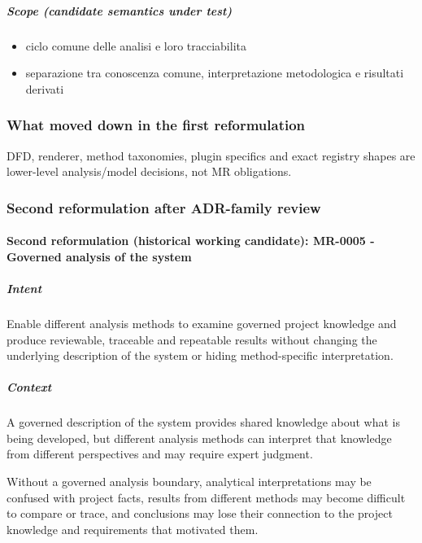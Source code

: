 \documentclass[
  10pt,
]{article}
\providecommand{\tightlist}{%
  \setlength{\itemsep}{0pt}\setlength{\parskip}{0pt}}
\begin{document}
\subparagraph{Scope (candidate semantics under
test)}\label{scope-candidate-semantics-under-test-4}

\begin{itemize}
\tightlist
\item
  ciclo comune delle analisi e loro tracciabilita
\item
  separazione tra conoscenza comune, interpretazione metodologica e
  risultati derivati
\end{itemize}

\subsubsection{What moved down in the first
reformulation}\label{what-moved-down-in-the-first-reformulation-1}

DFD, renderer, method taxonomies, plugin specifics and exact registry
shapes are lower-level analysis/model decisions, not MR obligations.

\subsubsection{Second reformulation after ADR-family
review}\label{second-reformulation-after-adr-family-review-1}

\paragraph{Second reformulation (historical working candidate): MR-0005
- Governed analysis of the
system}\label{second-reformulation-historical-working-candidate-mr-0005---governed-analysis-of-the-system}

\subparagraph{Intent}\label{intent-11}

Enable different analysis methods to examine governed project knowledge
and produce reviewable, traceable and repeatable results without
changing the underlying description of the system or hiding
method-specific interpretation.

\subparagraph{Context}\label{context-11}

A governed description of the system provides shared knowledge about
what is being developed, but different analysis methods can interpret
that knowledge from different perspectives and may require expert
judgment.

Without a governed analysis boundary, analytical interpretations may be
confused with project facts, results from different methods may become
difficult to compare or trace, and conclusions may lose their connection
to the project knowledge and requirements that motivated them.
\end{document}
